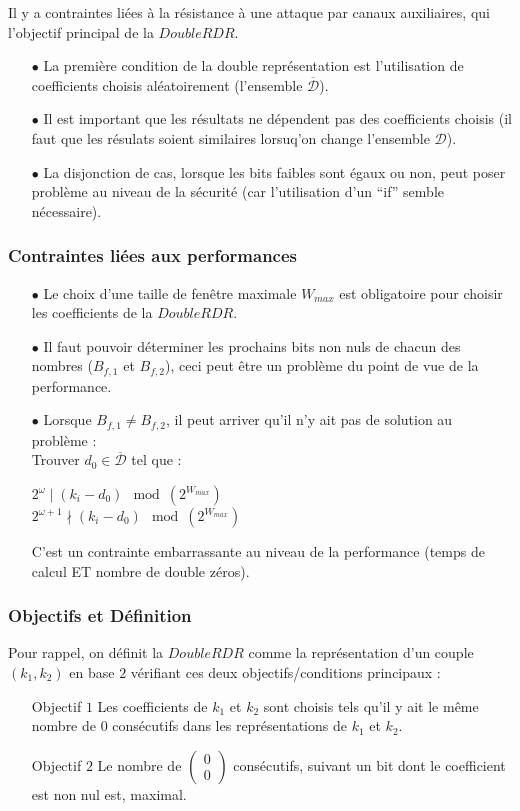\documentclass[12pt, a4paper]{memoir}
\newcommand{\doublezero}{\begin{pmatrix} 0 \\ 0 \end{pmatrix}}
\newcommand{\dbarre}{\overline{\mathcal{D}}}
\begin{document}
Il y a contraintes liées à la résistance à une attaque par canaux auxiliaires, qui l'objectif principal de la $DoubleRDR$.
\begin{itemize}
 \item [$\bullet$] La première condition de la double représentation est l'utilisation de coefficients choisis aléatoirement (l'ensemble $\overline{\mathcal{D}}$).
 \item [$\bullet$] Il est important que les résultats ne dépendent pas des coefficients choisis (il faut que 
 les résulats soient similaires lorsuq'on change l'ensemble $\mathcal{D}$).
 \item [$\bullet$] La disjonction de cas, lorsque les bits faibles sont égaux ou non, peut poser problème
 au niveau de la sécurité (car l'utilisation d'un ``if'' semble nécessaire).
 \end{itemize}

\subsubsection{Contraintes liées aux performances}

 
\begin{itemize}
 \item [$\bullet$] Le choix d'une taille de fenêtre maximale $W_{max}$ est obligatoire pour choisir les 
 coefficients de la $DoubleRDR$.
 \item [$\bullet$] Il faut pouvoir déterminer les prochains bits non nuls de chacun des nombres ($B_{f,1}$ et $B_{f,2}$), 
 ceci peut être un problème du point de vue de la performance.
 \item [$\bullet$] Lorsque $B_{f,1} \neq B_{f,2}$, il peut arriver qu'il n'y ait pas de solution au problème : \\
    Trouver $d_0 \in \dbarre$ tel que :
   \begin{center}
    $2^{\omega} \mid (k_i - d_0) \mod (2^{W_{max}})$ \\
    $2^{\omega+1} \nmid (k_i - d_0) \mod (2^{W_{max}})$
   \end{center}
 C'est un contrainte embarrassante au niveau de la performance (temps de calcul ET nombre de double zéros).
\end{itemize}

\subsubsection{Objectifs et Définition}

Pour rappel, on définit la $DoubleRDR$ comme la représentation d'un couple $(k_1 , k_2)$ en base $2$ 
vérifiant ces deux objectifs/conditions principaux :
\begin{itemize}
 \item [Objectif $1$] Les coefficients de $k_1$ et $k_2$ sont choisis tels qu'il y ait le même nombre de $0$
 consécutifs dans les représentations de $k_1$ et $k_2$.
 \item [Objectif $2$] Le nombre de $\doublezero$ consécutifs, suivant un bit dont le coefficient est non nul est, maximal. 
\end{itemize}
\end{document}
